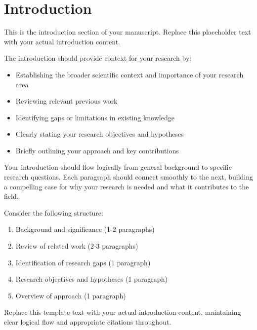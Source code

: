 
\section{Introduction}

This is the introduction section of your manuscript. Replace this placeholder text with your actual introduction content.

The introduction should provide context for your research by:
\begin{itemize}
    \item Establishing the broader scientific context and importance of your research area
    \item Reviewing relevant previous work \cite{example_reference_2020}
    \item Identifying gaps or limitations in existing knowledge
    \item Clearly stating your research objectives and hypotheses
    \item Briefly outlining your approach and key contributions
\end{itemize}

Your introduction should flow logically from general background to specific research questions. Each paragraph should connect smoothly to the next, building a compelling case for why your research is needed and what it contributes to the field.

Consider the following structure:
\begin{enumerate}
    \item Background and significance (1-2 paragraphs)
    \item Review of related work (2-3 paragraphs)
    \item Identification of research gaps (1 paragraph)
    \item Research objectives and hypotheses (1 paragraph)
    \item Overview of approach (1 paragraph)
\end{enumerate}

Replace this template text with your actual introduction content, maintaining clear logical flow and appropriate citations throughout.

